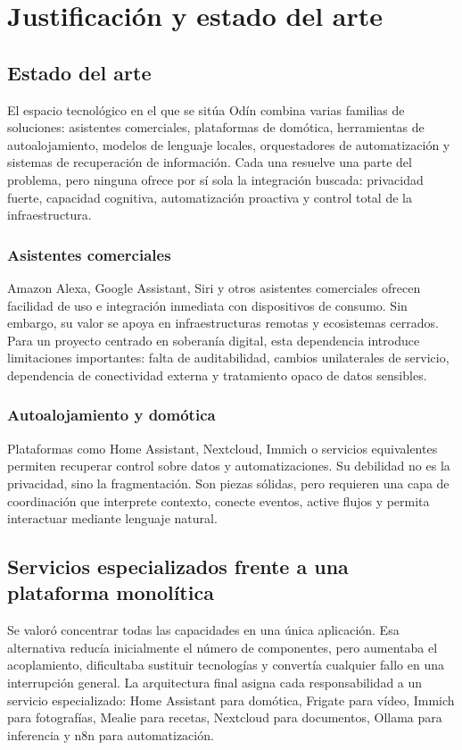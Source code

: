 \chapter{Justificación y estado del arte}

\section{Estado del arte}
El espacio tecnológico en el que se sitúa Odín combina varias familias de soluciones: asistentes comerciales, plataformas de domótica, herramientas de autoalojamiento, modelos de lenguaje locales, orquestadores de automatización y sistemas de recuperación de información. Cada una resuelve una parte del problema, pero ninguna ofrece por sí sola la integración buscada: privacidad fuerte, capacidad cognitiva, automatización proactiva y control total de la infraestructura.

\subsection{Asistentes comerciales}
Amazon Alexa, Google Assistant, Siri y otros asistentes comerciales ofrecen facilidad de uso e integración inmediata con dispositivos de consumo. Sin embargo, su valor se apoya en infraestructuras remotas y ecosistemas cerrados. Para un proyecto centrado en soberanía digital, esta dependencia introduce limitaciones importantes: falta de auditabilidad, cambios unilaterales de servicio, dependencia de conectividad externa y tratamiento opaco de datos sensibles.

\subsection{Autoalojamiento y domótica}
Plataformas como Home Assistant, Nextcloud, Immich o servicios equivalentes permiten recuperar control sobre datos y automatizaciones. Su debilidad no es la privacidad, sino la fragmentación. Son piezas sólidas, pero requieren una capa de coordinación que interprete contexto, conecte eventos, active flujos y permita interactuar mediante lenguaje natural.

\section{Servicios especializados frente a una plataforma monolítica}
Se valoró concentrar todas las capacidades en una única aplicación. Esa alternativa reducía inicialmente el número de componentes, pero aumentaba el acoplamiento, dificultaba sustituir tecnologías y convertía cualquier fallo en una interrupción general. La arquitectura final asigna cada responsabilidad a un servicio especializado: Home Assistant para domótica, Frigate para vídeo, Immich para fotografías, Mealie para recetas, Nextcloud para documentos, Ollama para inferencia y n8n para automatización.

